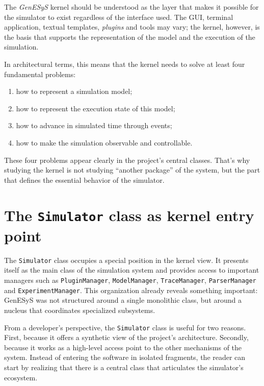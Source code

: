 The \textit{GenESyS} kernel should be understood as the layer that makes it possible for the simulator to exist regardless of the interface used. The GUI, terminal application, textual templates, \textit{plugins} and tools may vary; the kernel, however, is the basis that supports the representation of the model and the execution of the simulation.

In architectural terms, this means that the kernel needs to solve at least four fundamental problems:

\begin{enumerate}
 \item how to represent a simulation model;
 \item how to represent the execution state of this model;
 \item how to advance in simulated time through events;
 \item how to make the simulation observable and controllable.
\end{enumerate}

These four problems appear clearly in the project's central classes. That's why studying the kernel is not studying ``another package'' of the system, but the part that defines the essential behavior of the simulator.

\section{The \texttt{Simulator} class as kernel entry point}
\label{sec:cap7_classe_simulator}

The \texttt{Simulator} class occupies a special position in the kernel view. It presents itself as the main class of the simulation system and provides access to important managers such as \texttt{PluginManager}, \texttt{ModelManager}, \texttt{TraceManager}, \texttt{ParserManager} and \texttt{ExperimentManager}. This organization already reveals something important: GenESyS was not structured around a single monolithic class, but around a nucleus that coordinates specialized subsystems.

From a developer's perspective, the \texttt{Simulator} class is useful for two reasons. First, because it offers a synthetic view of the project's architecture. Secondly, because it works as a high-level access point to the other mechanisms of the system. Instead of entering the software in isolated fragments, the reader can start by realizing that there is a central class that articulates the simulator's ecosystem.

